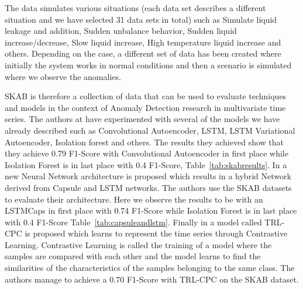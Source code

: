 \documentclass[a4paper,12pt]{report}
\theoremstyle{definitionNODot}
\begin{document}
	The data simulates various situations (each data set describes a different situation and we have selected 31 data sets in total) such as Simulate liquid leakage and addition, Sudden unbalance behavior, Sudden liquid increase/decrease, Slow liquid increase, High temperature liquid increase and others. Depending on the case, a different set of data has been created where initially the system works in normal conditions and then a scenario is simulated where we observe the anomalies.
	
	SKAB is therefore a collection of data that can be used to evaluate techniques and models in the context of Anomaly Detection research in multivariate time series. The authors at \cite{skabdataset} have experimented with several of the models we have already described such as Convolutional Autoencoder, LSTM, LSTM Variational Autoencoder, Isolation forest and others. The results they achieved show that they achieve 0.79 F1-Score with Convolutional Autoencoder in first place while Isolation Forest is in last place with 0.4 F1-Score, Table~\ref{tab:skabresults}. In \cite{elhalwagy2022hybridization} a new Neural Network architecture is proposed which results in a hybrid Network derived from Capsule and LSTM networks. The authors use the SKAB datasets to evaluate their architecture. Here we observe the results to be with an LSTMCaps in first place with 0.74 F1-Score while Isolation Forest is in last place with 0.4 F1-Score Table~\ref{tab:capsuleandlstm}. Finally in \cite{pranavan2022contrastive} a model called TRL-CPC is proposed which learns to represent the time series through Contrastive Learning. Contrastive Learning is called the training of a model where the samples are compared with each other and the model learns to find the similarities of the characteristics of the samples belonging to the same class. The authors manage to achieve a 0.70 F1-Score with TRL-CPC on the SKAB dataset.  
	
\end{document}
